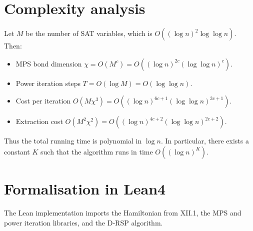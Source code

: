 \documentclass[11pt,a4paper]{article}
\begin{document}
\section{Complexity analysis}

Let \(M\) be the number of SAT variables, which is \(O((\log n)^2 \log \log n)\). Then:
\begin{itemize}
\item MPS bond dimension \(\chi = O(M^c) = O((\log n)^{2c} (\log \log n)^c)\).
\item Power iteration steps \(T = O(\log M) = O(\log \log n)\).
\item Cost per iteration \(O(M\chi^3) = O((\log n)^{6c+1} (\log \log n)^{3c+1})\).
\item Extraction cost \(O(M^2 \chi^2) = O((\log n)^{4c+2} (\log \log n)^{2c+2})\).
\end{itemize}
Thus the total running time is polynomial in \(\log n\). In particular, there exists a constant \(K\) such that the algorithm runs in time \(O((\log n)^K)\).

\section{Formalisation in Lean4}

The Lean implementation imports the Hamiltonian from XII.1, the MPS and power iteration libraries, and the D‑RSP algorithm.
\end{document}
